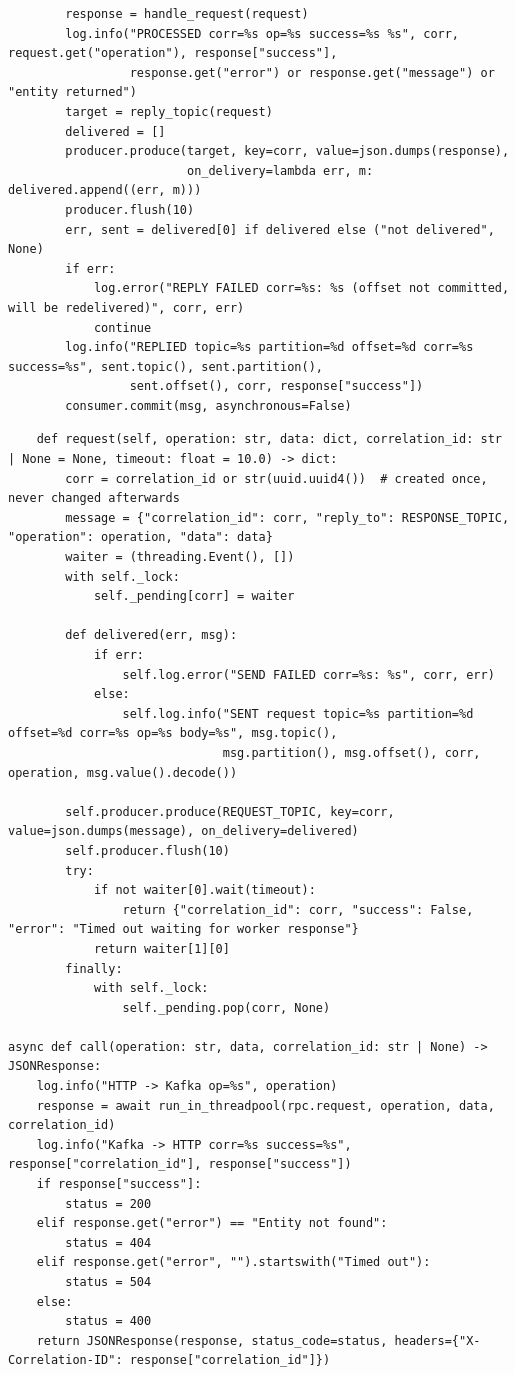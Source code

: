 \documentclass[11pt]{article}
\begin{document}
\endgroup
\begingroup\lstset{basicstyle=\ttfamily\tiny}
\begin{lstlisting}
        response = handle_request(request)
        log.info("PROCESSED corr=%s op=%s success=%s %s", corr, request.get("operation"), response["success"],
                 response.get("error") or response.get("message") or "entity returned")
        target = reply_topic(request)
        delivered = []
        producer.produce(target, key=corr, value=json.dumps(response),
                         on_delivery=lambda err, m: delivered.append((err, m)))
        producer.flush(10)
        err, sent = delivered[0] if delivered else ("not delivered", None)
        if err:
            log.error("REPLY FAILED corr=%s: %s (offset not committed, will be redelivered)", corr, err)
            continue
        log.info("REPLIED topic=%s partition=%d offset=%d corr=%s success=%s", sent.topic(), sent.partition(),
                 sent.offset(), corr, response["success"])
        consumer.commit(msg, asynchronous=False)
\end{lstlisting}
\endgroup
\begingroup\lstset{basicstyle=\ttfamily\tiny}
\begin{lstlisting}
    def request(self, operation: str, data: dict, correlation_id: str | None = None, timeout: float = 10.0) -> dict:
        corr = correlation_id or str(uuid.uuid4())  # created once, never changed afterwards
        message = {"correlation_id": corr, "reply_to": RESPONSE_TOPIC, "operation": operation, "data": data}
        waiter = (threading.Event(), [])
        with self._lock:
            self._pending[corr] = waiter

        def delivered(err, msg):
            if err:
                self.log.error("SEND FAILED corr=%s: %s", corr, err)
            else:
                self.log.info("SENT request topic=%s partition=%d offset=%d corr=%s op=%s body=%s", msg.topic(),
                              msg.partition(), msg.offset(), corr, operation, msg.value().decode())

        self.producer.produce(REQUEST_TOPIC, key=corr, value=json.dumps(message), on_delivery=delivered)
        self.producer.flush(10)
        try:
            if not waiter[0].wait(timeout):
                return {"correlation_id": corr, "success": False, "error": "Timed out waiting for worker response"}
            return waiter[1][0]
        finally:
            with self._lock:
                self._pending.pop(corr, None)

async def call(operation: str, data, correlation_id: str | None) -> JSONResponse:
    log.info("HTTP -> Kafka op=%s", operation)
    response = await run_in_threadpool(rpc.request, operation, data, correlation_id)
    log.info("Kafka -> HTTP corr=%s success=%s", response["correlation_id"], response["success"])
    if response["success"]:
        status = 200
    elif response.get("error") == "Entity not found":
        status = 404
    elif response.get("error", "").startswith("Timed out"):
        status = 504
    else:
        status = 400
    return JSONResponse(response, status_code=status, headers={"X-Correlation-ID": response["correlation_id"]})
\end{lstlisting}
\endgroup
\end{document}
